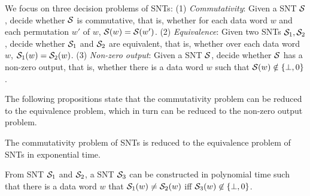 


%
%
%




We focus on three decision problems of SNTs: (1) \emph{Commutativity}: Given a SNT ${\mathcal{S} }$, decide whether ${\mathcal{S} }$ is commutative, that is, whether for each data word $w$ and each permutation $w'$ of $w$, ${\mathcal{S} }(w)={\mathcal{S} }(w')$. (2) \emph{Equivalence}: Given two SNTs ${\mathcal{S} }_1,{\mathcal{S} }_2$, decide whether ${\mathcal{S} }_1$ and ${\mathcal{S} }_2$ are equivalent, that is, whether over each data word $w$, ${\mathcal{S} }_1(w)={\mathcal{S} }_2(w)$. (3) \emph{Non-zero output}: Given a SNT ${\mathcal{S} }$, decide whether ${\mathcal{S} }$ has a non-zero output, that is, whether there is a data word $w$ such that ${\mathcal{S} }(w)\notin \{\bot, 0\}$. 

The following propositions state that the commutativity problem can be reduced to the equivalence problem, which in turn can be reduced to the non-zero output problem.

\begin{proposition}\label{prop-snt-cmm-to-eqv}
The commutativity problem of SNTs is reduced to the equivalence problem of SNTs in exponential time. 
\end{proposition}
\begin{proposition}\label{prop-snt-eqv-to-nzero}
From SNT ${\mathcal{S} }_1$ and ${\mathcal{S} }_2$, a SNT ${\mathcal{S} }_3$ can be constructed in polynomial time such that there is a data word $w$ that ${\mathcal{S} }_1(w) \neq {\mathcal{S} }_2(w)$ iff ${\mathcal{S} }_3(w) \not\in \{\bot,0\}$. 
\end{proposition}


